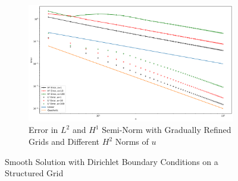 \documentclass[11pt,a4paper]{article}
\begin{document}
\begin{figure}
\begin{subfigure}{.8\textwidth}
    \centering
    \includegraphics[width=.9\linewidth]{errors_smooth_reg}
    \caption{Error in $L^2$ and $H^1$ Semi-Norm with Gradually Refined Grids and Different $H^2$ Norms of $u$}
  \end{subfigure}
  \label{fig:smooth_dirichlet_str_errs}
  \caption{Smooth Solution with Dirichlet Boundary Conditions on a Structured Grid}
\end{figure}
\end{document}
